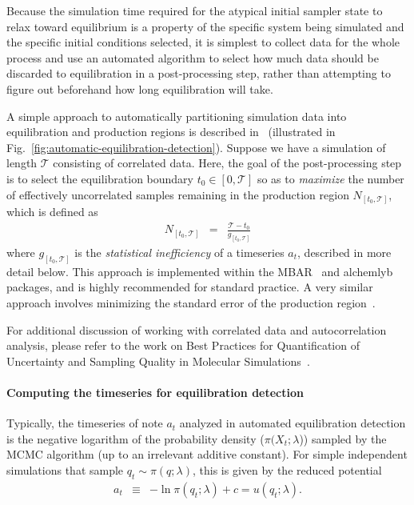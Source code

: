 Because the simulation time required for the atypical initial sampler state to relax toward equilibrium is a property of the specific system being simulated and the specific initial conditions selected, it is simplest to collect data for the whole process and use an automated algorithm to select how much data should be discarded to equilibration in a post-processing step, rather than attempting to figure out beforehand how long equilibration will take. 

A simple approach to automatically partitioning simulation data into equilibration and production regions is described in~\cite{chodera2016simple} (illustrated in Fig.~\ref{fig:automatic-equilibration-detection}).
Suppose we have a simulation of length $\mathcal{T}$ consisting of correlated data.
Here, the goal of the post-processing step is to select the equilibration boundary $t_0 \in [0, \mathcal{T}]$ so as to \emph{maximize} the number of effectively uncorrelated samples remaining in the production region $N_{[t_0,\mathcal{T}]}$, which is defined as
\begin{eqnarray}
N_{[t_0,\mathcal{T}]} &=& \frac{\mathcal{T} - t_0}{g_{[t_0,\mathcal{T}]}}
\end{eqnarray}
where $g_{[t_0,\mathcal{T}]}$ is the \emph{statistical inefficiency} of a timeseries $a_t$, described in more detail below.
This approach is implemented within the MBAR~\cite{kylebeauchamp2019choderalab} and alchemlyb~\cite{daviddotson2019alchemistry} packages, and is highly recommended for standard practice. A very similar approach involves minimizing the standard error of the production region~\cite{whiteEffectiveTruncationHeuristic1997, sprattHeuristicsStartupProblem1998, hoadAutomatingWarmupLength2010, clarkRobustAutomatedTruncation2025}.

For additional discussion of working with correlated data and autocorrelation analysis, please refer to the work on Best Practices for Quantification of Uncertainty and Sampling Quality in Molecular Simulations~\cite{grossfield2018best}.


\paragraph{Computing the timeseries for equilibration detection}
Typically, the timeseries of note $a_t$ analyzed in automated equilibration detection is the negative logarithm of the probability density ($\pi(X_t; \lambda$)) sampled by the MCMC algorithm (up to an irrelevant additive constant).
For simple independent simulations that sample $q_t \sim \pi(q ; \lambda)$, this is given by the reduced potential
\begin{eqnarray}
a_t &\equiv& - \ln \pi(q_t; \lambda) + c = u(q_t; \lambda) .
\end{eqnarray}

